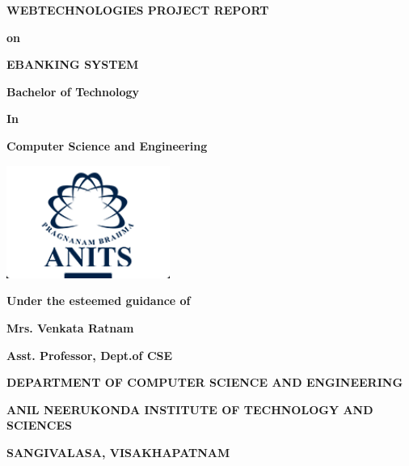 \begin{titlepage}
  \centering{}
  {\fontsize{24}{28}\selectfont{}\bfseries{} WEB\-TECHNOLOGIES PROJECT REPORT\par}
  \vspace{0.3cm}
  {\fontsize{18}{22}\selectfont{}\bfseries{} on\par}
  \vspace{0.3cm}
  {\fontsize{24}{28}\selectfont{}\bfseries{} E\-BANKING SYSTEM\par}
  \vspace{1cm}
  {\fontsize{18}{22}\selectfont{}\bfseries{} Bachelor of Technology\par}
  \vspace{0.1cm}
  {\fontsize{18}{22}\selectfont{}\bfseries{} In\par}
  \vspace{0.1cm}
  {\fontsize{18}{22}\selectfont{}\bfseries{} Computer Science and
  Engineering\par}
  \includegraphics[width=0.4\textwidth]{anits_logo.png}\par{}
  \vspace{1cm}
  {\fontsize{18}{22}\selectfont\bfseries{} Under the esteemed guidance of\par}
  \vspace{0.2cm}
  {\fontsize{18}{22}\selectfont\bfseries{} Mrs. Venkata Ratnam\par}
  \vspace{0.2cm}
  {\fontsize{18}{22}\selectfont\bfseries{} Asst. Professor, Dept.\@ of CSE\par}
  \vspace{1cm}
  {\fontsize{18}{22}\selectfont\bfseries{} DEPARTMENT OF COMPUTER
  SCIENCE AND ENGINEERING\par}
  \vspace{0.3cm}
  {\fontsize{18}{22}\selectfont\bfseries{} ANIL NEERUKONDA INSTITUTE OF
  TECHNOLOGY AND SCIENCES\par}
  \vspace{0.3cm}
  {\fontsize{18}{22}\selectfont\bfseries{}{} SANGIVALASA, VISAKHAPATNAM\par}
\end{titlepage}

